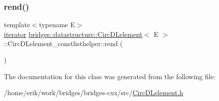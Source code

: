 \mbox{\label{classbridges_1_1datastructure_1_1_circ_d_lelement_1_1_circ_d_lelement__constlisthelper_adcfb956dad9f130975df6632f97a3b82}} 
\subsubsection{\texorpdfstring{rend()}{rend()}}
{\footnotesize\ttfamily template$<$typename E$>$ \\
\hyperlink{classbridges_1_1datastructure_1_1_circ_d_lelement_1_1_circ_d_lelement__constlisthelper_1_1iterator}{iterator} \hyperlink{classbridges_1_1datastructure_1_1_circ_d_lelement}{bridges\+::datastructure\+::\+Circ\+D\+Lelement}$<$ E $>$\+::Circ\+D\+Lelement\+\_\+constlisthelper\+::rend (\begin{DoxyParamCaption}{ }\end{DoxyParamCaption})\hspace{0.3cm}{\ttfamily [inline]}}



The documentation for this class was generated from the following file\+:\begin{DoxyCompactItemize}
\item 
/home/erik/work/bridges/bridges-\/cxx/src/\hyperlink{_circ_d_lelement_8h}{Circ\+D\+Lelement.\+h}\end{DoxyCompactItemize}

